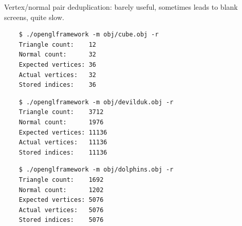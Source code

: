 \documentclass{beamer}
\begin{document}
\begin{frame}[fragile]
	Vertex/normal pair deduplication: barely useful, sometimes leads to blank screens, quite slow.
	\begin{lstlisting}
	$ ./openglframework -m obj/cube.obj -r
	Triangle count:    12
	Normal count:      32
	Expected vertices: 36
	Actual vertices:   32
	Stored indices:    36
	\end{lstlisting}
\end{frame}

\begin{frame}[fragile]
	\begin{lstlisting}
	$ ./openglframework -m obj/devilduk.obj -r
	Triangle count:    3712
	Normal count:      1976
	Expected vertices: 11136
	Actual vertices:   11136
	Stored indices:    11136
	\end{lstlisting}
	\begin{lstlisting}
	$ ./openglframework -m obj/dolphins.obj -r
	Triangle count:    1692
	Normal count:      1202
	Expected vertices: 5076
	Actual vertices:   5076
	Stored indices:    5076
	\end{lstlisting}
\end{frame}
\end{document}
